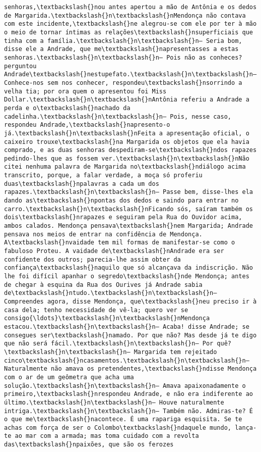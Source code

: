 \documentclass[11pt]{article}
\begin{document}
\begin{Verbatim}[commandchars=\\\{\}]
senhoras,\textbackslash{}nou antes apertou a mão de Antônia e os dedos de Margarida.\textbackslash{}n\textbackslash{}nMendonça não contava com este incidente,\textbackslash{}ne alegrou-se com ele por ter à mão o meio de tornar íntimas as relações\textbackslash{}nsuperficiais que tinha com a família.\textbackslash{}n\textbackslash{}n— Seria bom, disse ele a Andrade, que me\textbackslash{}napresentasses a estas senhoras.\textbackslash{}n\textbackslash{}n— Pois não as conheces? perguntou Andrade\textbackslash{}nestupefato.\textbackslash{}n\textbackslash{}n— Conhece-nos sem nos conhecer, respondeu\textbackslash{}nsorrindo a velha tia; por ora quem o apresentou foi Miss Dollar.\textbackslash{}n\textbackslash{}nAntônia referiu a Andrade a perda e o\textbackslash{}nachado da cadelinha.\textbackslash{}n\textbackslash{}n— Pois, nesse caso, respondeu Andrade,\textbackslash{}napresento-o já.\textbackslash{}n\textbackslash{}nFeita a apresentação oficial, o caixeiro trouxe\textbackslash{}na Margarida os objetos que ela havia comprado, e as duas senhoras despediram-se\textbackslash{}ndos rapazes pedindo-lhes que as fossem ver.\textbackslash{}n\textbackslash{}nNão citei nenhuma palavra de Margarida no\textbackslash{}ndiálogo acima transcrito, porque, a falar verdade, a moça só proferiu duas\textbackslash{}npalavras a cada um dos rapazes.\textbackslash{}n\textbackslash{}n— Passe bem, disse-lhes ela dando as\textbackslash{}npontas dos dedos e saindo para entrar no carro.\textbackslash{}n\textbackslash{}nFicando sós, saíram também os dois\textbackslash{}nrapazes e seguiram pela Rua do Ouvidor acima, ambos calados. Mendonça pensava\textbackslash{}nem Margarida; Andrade pensava nos meios de entrar na confidência de Mendonça. A\textbackslash{}nvaidade tem mil formas de manifestar-se como o fabuloso Proteu. A vaidade de\textbackslash{}nAndrade era ser confidente dos outros; parecia-lhe assim obter da confiança\textbackslash{}naquilo que só alcançava da indiscrição. Não lhe foi difícil apanhar o segredo\textbackslash{}nde Mendonça; antes de chegar à esquina da Rua dos Ourives já Andrade sabia de\textbackslash{}ntudo.\textbackslash{}n\textbackslash{}n— Compreendes agora, disse Mendonça, que\textbackslash{}neu preciso ir à casa dela; tenho necessidade de vê-la; quero ver se consigo{\ldots}\textbackslash{}n\textbackslash{}nMendonça estacou.\textbackslash{}n\textbackslash{}n— Acaba! disse Andrade; se consegues ser\textbackslash{}namado. Por que não? Mas desde já te digo que não será fácil.\textbackslash{}n\textbackslash{}n— Por quê?\textbackslash{}n\textbackslash{}n— Margarida tem rejeitado cinco\textbackslash{}ncasamentos.\textbackslash{}n\textbackslash{}n— Naturalmente não amava os pretendentes,\textbackslash{}ndisse Mendonça com o ar de um geômetra que acha uma solução.\textbackslash{}n\textbackslash{}n— Amava apaixonadamente o primeiro,\textbackslash{}nrespondeu Andrade, e não era indiferente ao último.\textbackslash{}n\textbackslash{}n— Houve naturalmente intriga.\textbackslash{}n\textbackslash{}n— Também não. Admiras-te? É o que me\textbackslash{}nacontece. É uma rapariga esquisita. Se te achas com força de ser o Colombo\textbackslash{}ndaquele mundo, lança-te ao mar com a armada; mas toma cuidado com a revolta das\textbackslash{}npaixões, que são os ferozes 
\end{Verbatim}
\end{document}
